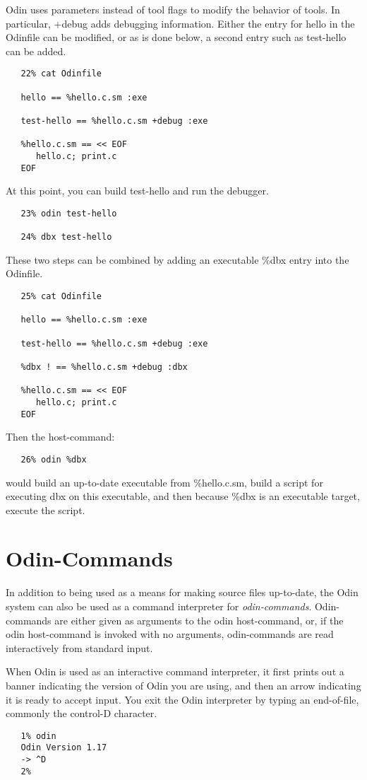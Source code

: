 Odin uses parameters instead of tool flags to modify the behavior of tools.
In particular, {\ex +debug} adds debugging information.
Either the entry for {\ex hello} in the {\ex Odinfile} can be modified,
or as is done below, a second entry such as {\ex test-hello} can be added.
\begin{verbatim}
   22% cat Odinfile

   hello == %hello.c.sm :exe

   test-hello == %hello.c.sm +debug :exe

   %hello.c.sm == << EOF
      hello.c; print.c
   EOF
\end{verbatim}
At this point, you can build {\ex test-hello} and run the debugger.
\begin{verbatim}
   23% odin test-hello

   24% dbx test-hello
\end{verbatim}
These two steps can be combined by adding an executable {\ex \%dbx} entry
into the {\ex Odinfile}.
\begin{verbatim}
   25% cat Odinfile

   hello == %hello.c.sm :exe

   test-hello == %hello.c.sm +debug :exe

   %dbx ! == %hello.c.sm +debug :dbx

   %hello.c.sm == << EOF
      hello.c; print.c
   EOF
\end{verbatim}
Then the host-command:
\begin{verbatim}
   26% odin %dbx
\end{verbatim}
would build an up-to-date executable from {\ex \%hello.c.sm},
build a script for executing dbx on this executable,
and then because {\ex \%dbx} is an executable target, execute the script.


\chapter{Odin-Commands}
\label{command}


In addition to being used as a means for making source files up-to-date,
the Odin system can also be used as a command interpreter for
{\em odin-commands}.
Odin-commands are either given as arguments to the {\ex odin} host-command,
or, if the {\ex odin} host-command is invoked with no arguments, 
odin-commands are read interactively from standard input.

When Odin is used as an interactive command interpreter,
it first prints out a banner indicating the version of Odin you are using,
and then an arrow indicating it is ready to accept input.
You exit the Odin interpreter by typing an end-of-file,
commonly the control-D character.
\begin{verbatim}
   1% odin
   Odin Version 1.17
   -> ^D
   2%
\end{verbatim}


